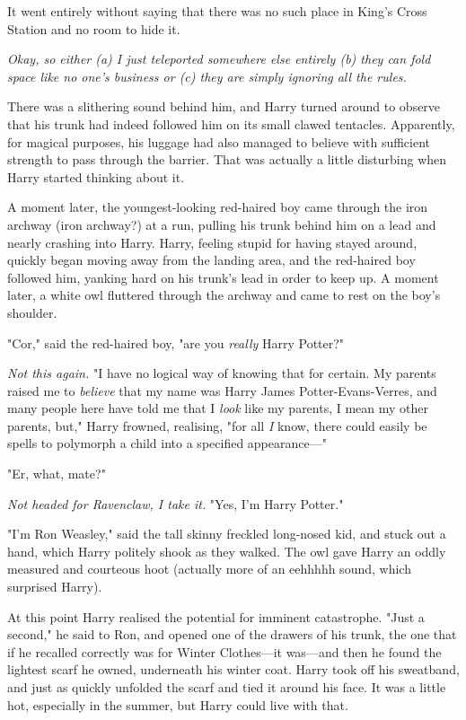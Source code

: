 It went entirely without saying that there was no such place in King's Cross 
Station and no room to hide it.

\emph{Okay, so either (a) I just teleported somewhere else entirely (b) they 
can fold space like no one's business or (c) they are simply ignoring all the 
rules.}

There was a slithering sound behind him, and Harry turned around to observe 
that his trunk had indeed followed him on its small clawed tentacles. 
Apparently, for magical purposes, his luggage had also managed to believe with 
sufficient strength to pass through the barrier. That was actually a little 
disturbing when Harry started thinking about it.

A moment later, the youngest-looking red-haired boy came through the iron 
archway (iron archway?) at a run, pulling his trunk behind him on a lead and 
nearly crashing into Harry. Harry, feeling stupid for having stayed around, 
quickly began moving away from the landing area, and the red-haired boy 
followed him, yanking hard on his trunk's lead in order to keep up. A moment 
later, a white owl fluttered through the archway and came to rest on the boy's 
shoulder.

"Cor," said the red-haired boy, "are you \emph{really} Harry Potter?"

\emph{Not this again.} "I have no logical way of knowing that for certain. My 
parents raised me to \emph{believe} that my name was Harry James 
Potter-Evans-Verres, and many people here have told me that I \emph{look} like 
my parents, I mean my other parents, but," Harry frowned, realising, "for all 
\emph{I} know, there could easily be spells to polymorph a child into a 
specified appearance---"

"Er, what, mate?"

\emph{Not headed for Ravenclaw, I take it.} "Yes, I'm Harry Potter."

"I'm Ron Weasley," said the tall skinny freckled long-nosed kid, and stuck out 
a hand, which Harry politely shook as they walked. The owl gave Harry an oddly 
measured and courteous hoot (actually more of an eehhhhh sound, which surprised 
Harry).

At this point Harry realised the potential for imminent catastrophe. "Just a 
second," he said to Ron, and opened one of the drawers of his trunk, the one 
that if he recalled correctly was for Winter Clothes---it was---and then he 
found the lightest scarf he owned, underneath his winter coat. Harry took off 
his sweatband, and just as quickly unfolded the scarf and tied it around his 
face. It was a little hot, especially in the summer, but Harry could live with 
that.

